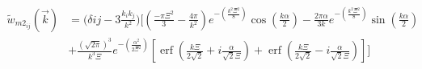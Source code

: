 \documentclass[letterpaper,twocolumn,amsmath,amssymb,prb]{revtex4-1}
\begin{document}
\begin{widetext}
\begin{align}
  \widetilde{w}_{m2_{ij}}(\vec{k})&= \bigg(\delta{ij}-3\frac{k_ik_j}{k^2}\bigg)\bigg[\left(\frac{-\pi\Xi^2}{3}-\frac{4\pi}{k^2}\right)e^{-\left(\frac{k^2\Xi^2}{8}\right)}\cos(\frac{k\alpha}{2})-\frac{2\pi\alpha}{3k}e^{-\left(\frac{k^2\Xi^2}{8}\right)}\sin(\frac{k\alpha}{2}) \nonumber\\ 
   &+ \frac{(\sqrt{2\pi})^3}{k^3\Xi}e^{-\left(\frac{\alpha^2}{2\Xi^2}\right)}\left[\operatorname{erf}\left(\frac{k\Xi}{2\sqrt{2}}+i\frac{\alpha}{\sqrt{2}\Xi}\right)+\operatorname{erf}\left(\frac{k\Xi}{2\sqrt{2}}-i\frac{\alpha}{\sqrt{2}\Xi}\right)\right]\bigg]
\end{align} 


\end{widetext}
\end{document}
